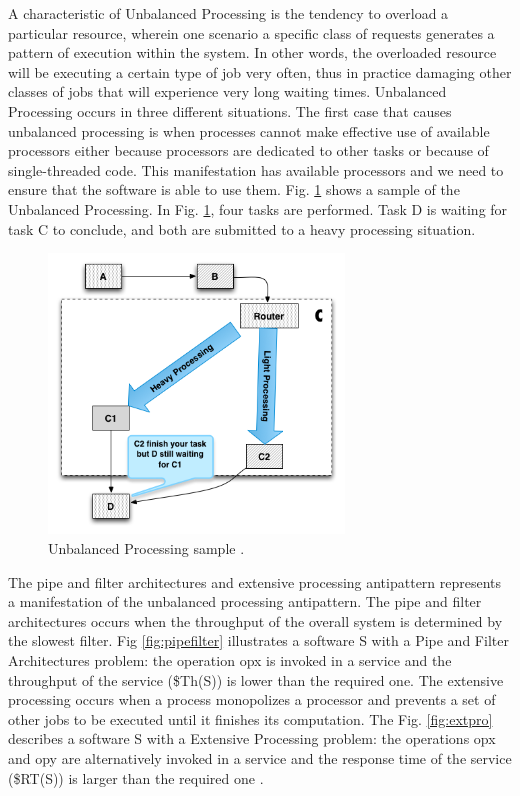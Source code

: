 \documentclass[espaco=umemeio,chapter=TITLE,twoside,openright]{abnt}
\begin{document}
A characteristic of Unbalanced Processing is the tendency to overload a particular resource, wherein one scenario a specific class of requests generates a pattern of execution within the system. In other words, the overloaded resource will be executing a certain type of job very often, thus in practice damaging other classes
of jobs that will experience very long waiting times. Unbalanced Processing occurs in three different situations. The first case that causes unbalanced processing is when processes cannot make effective use of available processors either because processors are dedicated to other tasks or because of single-threaded code. This manifestation has available processors and we need to ensure that the software is able to use them. Fig. \ref{fig:unbalanced}  shows a sample of the Unbalanced Processing. In Fig. \ref{fig:unbalanced}, four tasks are performed. Task D is waiting for task C to conclude, and both are submitted to a heavy processing situation.

\begin{figure}[h]
\centering
\includegraphics[width=0.7\textwidth]{./images/unbalanced.png}
\caption{Unbalanced Processing sample \cite{Wert2013a}. }
\label{fig:unbalanced}
\end{figure}

The pipe and filter architectures  and extensive processing antipattern represents a manifestation of the unbalanced processing antipattern. The pipe and filter architectures occurs when the throughput of the overall system is determined by the slowest filter. Fig \ref{fig:pipefilter} illustrates a software S with a Pipe and Filter Architectures problem:  the operation opx is invoked in a service  and the throughput of the service (\$Th(S)) is lower than the required one. The extensive processing occurs when a process monopolizes a processor and prevents a set of other jobs to be executed until it finishes its computation. The Fig. \ref{fig:extpro} describes a software S with a Extensive Processing problem: the operations opx and opy are alternatively invoked in a service and the response time of the service (\$RT(S)) is larger than the required one \cite{Vetoio2011}.
\end{document}

